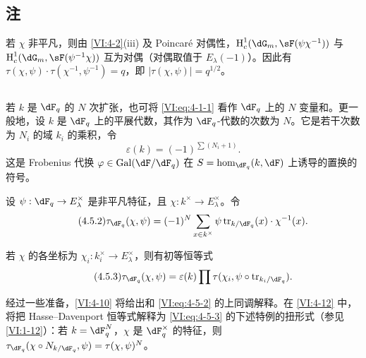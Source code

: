 \subsection{注}\label{VI:4-4}

若 $\chi$ 非平凡，则由 \ref{VI:4-2}(iii) 及 Poincaré 对偶性，$\h_c^1(\dG_m,\sF(\psi\chi^{-1}))$ 与 $\h_c^1(\dG_m,\sF(\psi^{-1}\chi))$ 互为对偶（对偶取值于 $E_\lambda(-1)$）。因此有 $\tau(\chi,\psi)\cdot \tau(\chi^{-1},\psi^{-1}) = q$，即 $|\tau(\chi,\psi)|=q^{1/2}$。

\subsection{}\label{VI:4-5}

若 $k$ 是 $\dF_q$ 的 $N$ 次扩张，也可将 \eqref{VI:eq:4-1-1} 看作 $\dF_q$ 上的 $N$ 变量和。更一般地，设 $k$ 是 $\dF_q$ 上的平展代数，其作为 $\dF_q$-代数的次数为 $N$。它是若干次数为 $N_i$ 的域 $k_i$ 的乘积，令
\begin{equation*}\tag{4.5.1}\label{VI:eq:4-5-1}
  \varepsilon(k) = (-1)^{\sum (N_i+1)} \text{.}
\end{equation*}
这是 Frobenius 代换 $\varphi\in \gal(\dF/\dF_q)$ 在 $S=\hom_{\dF_q}(k,\dF)$ 上诱导的置换的符号。

设 $\psi:\dF_q\to E_\lambda^\times$ 是非平凡特征，且 $\chi:k^\times \to E_\lambda^\times$。令
\begin{equation*}\tag{4.5.2}\label{VI:eq:4-5-2}
  \tau_{\dF_q}(\chi,\psi) = (-1)^N \sum_{x\in k^\times} \psi \tr_{k/\dF_q}(x) \cdot \chi^{-1}(x) \text{.}
\end{equation*}

若 $\chi$ 的各坐标为 $\chi_i:k_i^\times \to E_\lambda^\times$，则有初等恒等式
\begin{equation*}\tag{4.5.3}\label{VI:eq:4-5-3}
  \tau_{\dF_q}(\chi,\psi) = \varepsilon(k) \prod \tau(\chi_i,\psi\circ \tr_{k_i/\dF_q}) \text{.}
\end{equation*}

经过一些准备，\ref{VI:4-10} 将给出和 \eqref{VI:eq:4-5-2} 的上同调解释。在 \ref{VI:4-12} 中，将把 Hasse--Davenport 恒等式解释为 \eqref{VI:eq:4-5-3} 的下述特例的扭形式（参见 \ref{VI:1-12}）：若 $k=\dF_q^N$，$\chi$ 是 $\dF_q^\times$ 的特征，则 $\tau_{\dF_q}(\chi\circ N_{k/\dF_q},\psi)=\tau(\chi,\psi)^N$。

\subsection{}\label{VI:4-6}

